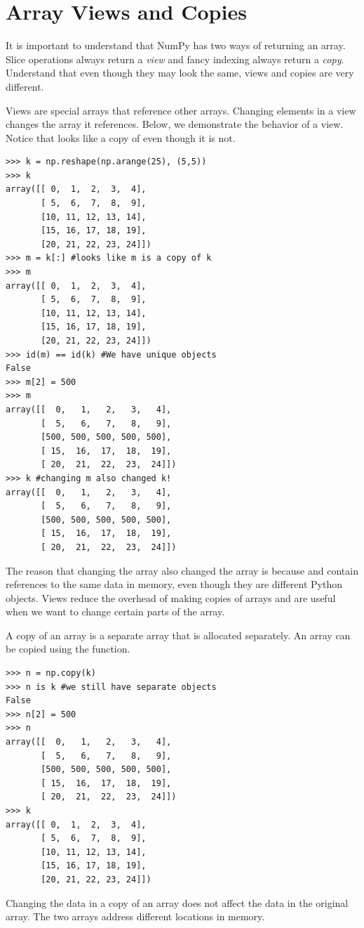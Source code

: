 \section*{Array Views and Copies}
It is important to understand that NumPy has two ways of returning an array.
Slice operations always return a \emph{view} and fancy indexing always return a \emph{copy}.
Understand that even though they may look the same, views and copies are very different.

Views are special arrays that reference other arrays.
Changing elements in a view changes the array it references.
Below, we demonstrate the behavior of a view.
Notice that  looks like a copy of  even though it is not.
\begin{lstlisting}
>>> k = np.reshape(np.arange(25), (5,5))
>>> k
array([[ 0,  1,  2,  3,  4],
       [ 5,  6,  7,  8,  9],
       [10, 11, 12, 13, 14],
       [15, 16, 17, 18, 19],
       [20, 21, 22, 23, 24]])
>>> m = k[:] #looks like m is a copy of k
>>> m
array([[ 0,  1,  2,  3,  4],
       [ 5,  6,  7,  8,  9],
       [10, 11, 12, 13, 14],
       [15, 16, 17, 18, 19],
       [20, 21, 22, 23, 24]])
>>> id(m) == id(k) #We have unique objects
False
>>> m[2] = 500
>>> m
array([[  0,   1,   2,   3,   4],
       [  5,   6,   7,   8,   9],
       [500, 500, 500, 500, 500],
       [ 15,  16,  17,  18,  19],
       [ 20,  21,  22,  23,  24]])
>>> k #changing m also changed k!
array([[  0,   1,   2,   3,   4],
       [  5,   6,   7,   8,   9],
       [500, 500, 500, 500, 500],
       [ 15,  16,  17,  18,  19],
       [ 20,  21,  22,  23,  24]])
\end{lstlisting}
The reason that changing the array  also changed the array  is because  
and  contain references to the same data in memory, even though they are different 
Python objects.
Views reduce the overhead of making copies of arrays and are useful when we want to change 
certain parts of the array.

A copy of an array is a separate array that is allocated separately.
An array can be copied using the  function.
\begin{lstlisting}
>>> n = np.copy(k)
>>> n is k #we still have separate objects
False
>>> n[2] = 500
>>> n
array([[  0,   1,   2,   3,   4],
       [  5,   6,   7,   8,   9],
       [500, 500, 500, 500, 500],
       [ 15,  16,  17,  18,  19],
       [ 20,  21,  22,  23,  24]])
>>> k
array([[ 0,  1,  2,  3,  4],
       [ 5,  6,  7,  8,  9],
       [10, 11, 12, 13, 14],
       [15, 16, 17, 18, 19],
       [20, 21, 22, 23, 24]])
\end{lstlisting}
Changing the data in a copy of an array does not affect the data in the original array.
The two arrays address different locations in memory.

